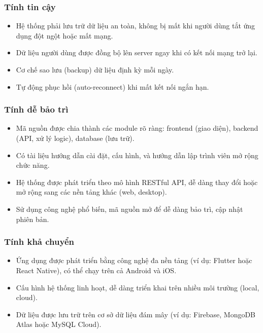 \subsubsection{Tính tin cậy}
\begin{itemize}
    \item Hệ thống phải lưu trữ dữ liệu an toàn, không bị mất khi người dùng tắt ứng dụng đột ngột hoặc mất mạng.
    \item Dữ liệu người dùng được đồng bộ lên server ngay khi có kết nối mạng trở lại.
    \item Cơ chế sao lưu (backup) dữ liệu định kỳ mỗi ngày.
    \item Tự động phục hồi (auto-reconnect) khi mất kết nối ngắn hạn.
\end{itemize}

\subsubsection{Tính dễ bảo trì}
\begin{itemize}
    \item Mã nguồn được chia thành các module rõ ràng: frontend (giao diện), backend (API, xử lý logic), database (lưu trữ).
    \item Có tài liệu hướng dẫn cài đặt, cấu hình, và hướng dẫn lập trình viên mở rộng chức năng.
    \item Hệ thống được phát triển theo mô hình RESTful API, dễ dàng thay đổi hoặc mở rộng sang các nền tảng khác (web, desktop).
    \item Sử dụng công nghệ phổ biến, mã nguồn mở để dễ dàng bảo trì, cập nhật phiên bản.
\end{itemize}

\subsubsection{Tính khả chuyển}
\begin{itemize}
    \item Ứng dụng được phát triển bằng công nghệ đa nền tảng (ví dụ: Flutter hoặc React Native), có thể chạy trên cả Android và iOS.
    \item Cấu hình hệ thống linh hoạt, dễ dàng triển khai trên nhiều môi trường (local, cloud).
    \item Dữ liệu được lưu trữ trên cơ sở dữ liệu đám mây (ví dụ: Firebase, MongoDB Atlas hoặc MySQL Cloud).
\end{itemize}

